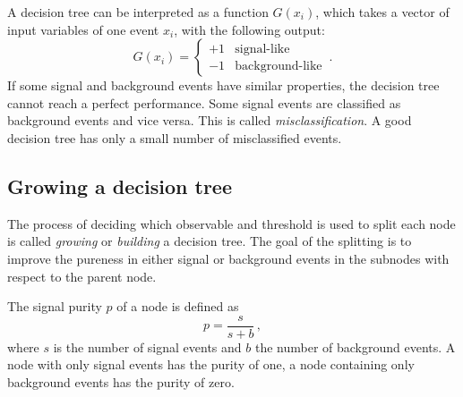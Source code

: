 A decision tree can be interpreted as a function $G(x_i)$, which takes a vector of input variables of one event $x_i$, with
the following output:
\begin{equation}
    \label{eq:dt}
    G(x_i) =
    \begin{cases}
        +1 & \text{signal-like} \\
        -1 & \text{background-like}
    \end{cases} \,.
\end{equation}
If some signal and background events have similar properties, the decision tree cannot reach a perfect performance.
Some signal events are classified as background events and vice versa.
This is called \emph{misclassification}.
A good decision tree has only a small number of misclassified events.

\subsection{Growing a decision tree}\label{sub:bdt:dt:growing}

The process of deciding which observable and threshold is used to split each node
is called \emph{growing} or \emph{building} a decision tree.
The goal of the splitting is to improve the pureness in either signal or background events in the subnodes with respect to the parent node.

The signal purity $p$ of a node is defined as
\begin{equation}
    \label{eq:purity}
    p = \frac{s}{s+b}\,,
\end{equation}
where $s$ is the number of signal events and $b$ the number of background events.
A node with only signal events has the purity of one, a node containing only background events has the purity of zero.

